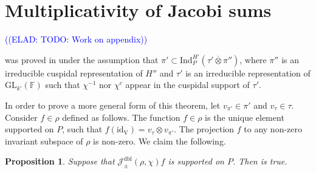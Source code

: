 \documentclass[12pt, reqno]{amsart}
\newtheorem{proposition}[theorem]{Proposition}
\theoremstyle{definition}
\theoremstyle{definition}
\theoremstyle{definition}
\newcommand{\idmap}{\mathrm{id}}
\newcommand{\hermitianSpace}{\mathrm{V}}
\newcommand{\Ind}[3]{\mathrm{Ind}_{#1}^{#2}\left(#3\right)}
\newcommand{\involution}[1]{#1^{c}}
\newcommand{\GL}{\mathrm{GL}}
\newcommand{\finiteField}{\mathbb{F}}
\newcommand{\dblJacobiSum}[2]{\mathcal{J}_{\pm}^{\mathrm{dbl}}\left(#1, #2\right)}
\newcommand{\elad}[1]{\textcolor{blue}{\sffamily ((ELAD: #1))}}
\begin{document}
\section{Multiplicativity of Jacobi sums} \label{appendix:multiplicativity-of-jacobi-sums}
\elad{TODO: Work on appendix}

 was proved in \cite{GirschZelingher2025} under the assumption that $\pi' \subset \Ind{P}{H'}{\tau' \overline{\otimes} \pi''}$, where $\pi''$ is an irreducible cuspidal representation of $H''$ and $\tau'$ is an irreducible representation of $\GL_{k'}\left(\finiteField\right)$ such that $\chi^{-1}$ nor $\involution{\chi}$ appear in the cuspidal support of $\tau'$.

In order to prove a more general form of this theorem, let $v_{\pi'} \in \pi'$ and $v_{\tau} \in \tau$. Consider $f \in \rho$ defined as follows. The function $f \in \rho$ is the unique element supported on $P$, such that $f\left(\idmap_{\hermitianSpace}\right) = v_{\tau} \otimes v_{\pi'}$. The projection $f$ to any non-zero invariant subspace of $\rho$ is non-zero. We claim the following.
\begin{proposition}\label{prop:multiplicativity-of-jacobi-sum-given-support}
	Suppose that $\dblJacobiSum{\rho}{\chi} f$ is supported on $P$. Then  is true.
\end{proposition}
\end{document}
